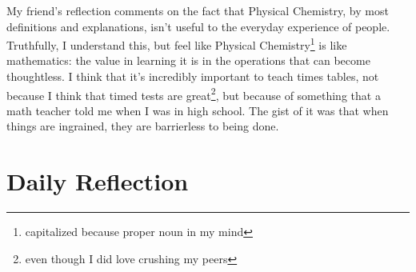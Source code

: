 \documentclass[12pt]{article}
\renewcommand{\,}{\textsuperscript{,}}
\begin{document}
My friend's reflection comments on the fact that Physical Chemistry, by most definitions and explanations, isn't useful to the everyday experience of people.  
Truthfully, I understand this, but feel like Physical Chemistry\footnote{capitalized because proper noun in my mind} is like mathematics: the value in learning it is in the operations that can become thoughtless.  
I think that it's incredibly important to teach times tables, not because I think that timed tests are great\footnote{even though I did love crushing my peers}, but because of something that a math teacher told me when I was in high school.  
The gist of it was that when things are ingrained, they are barrierless to being done.

\section{Daily Reflection}
\end{document}

